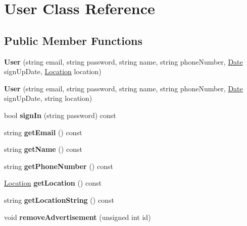 \hypertarget{class_user}{}\section{User Class Reference}
\label{class_user}
\subsection*{Public Member Functions}
\begin{DoxyCompactItemize}
\item 
\hypertarget{class_user_a670870b549b3675f2ebcc7045f89cd1f}{}{\bfseries User} (string email, string password, string name, string phone\+Number, \hyperlink{class_date}{Date} sign\+Up\+Date, \hyperlink{class_location}{Location} location)\label{class_user_a670870b549b3675f2ebcc7045f89cd1f}

\item 
\hypertarget{class_user_a55fbba82f16e683eba80f23d09d49e06}{}{\bfseries User} (string email, string password, string name, string phone\+Number, \hyperlink{class_date}{Date} sign\+Up\+Date, string location)\label{class_user_a55fbba82f16e683eba80f23d09d49e06}

\item 
\hypertarget{class_user_af75d18fdc45ac9fba9911815b78b7daa}{}bool {\bfseries sign\+In} (string password) const \label{class_user_af75d18fdc45ac9fba9911815b78b7daa}

\item 
\hypertarget{class_user_ac8a15550f3596a7ef13eb31b82a8ecf6}{}string {\bfseries get\+Email} () const \label{class_user_ac8a15550f3596a7ef13eb31b82a8ecf6}

\item 
\hypertarget{class_user_a2b2a3d00d303affb4f5674bc9788db52}{}string {\bfseries get\+Name} () const \label{class_user_a2b2a3d00d303affb4f5674bc9788db52}

\item 
\hypertarget{class_user_a4d59412a7d7411dd8c8127adc9e80fae}{}string {\bfseries get\+Phone\+Number} () const \label{class_user_a4d59412a7d7411dd8c8127adc9e80fae}

\item 
\hypertarget{class_user_a7c2072cbf540ae1bd47992b40783843c}{}\hyperlink{class_location}{Location} {\bfseries get\+Location} () const \label{class_user_a7c2072cbf540ae1bd47992b40783843c}

\item 
\hypertarget{class_user_a7185d303044e8dbb683b717228e2560d}{}string {\bfseries get\+Location\+String} () const \label{class_user_a7185d303044e8dbb683b717228e2560d}

\item 
\hypertarget{class_user_aa3bb1db20bfdae4ae26f8e5b84360f45}{}void {\bfseries remove\+Advertisement} (unsigned int id)\label{class_user_aa3bb1db20bfdae4ae26f8e5b84360f45}

\end{DoxyCompactItemize}

